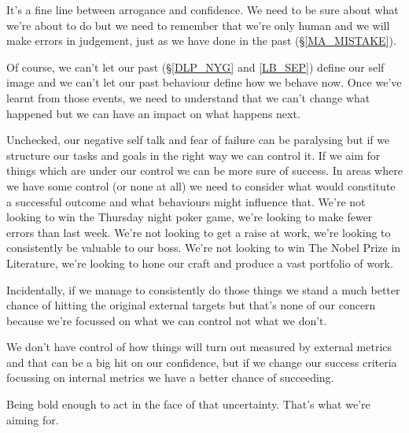 \cleardoublepage
{\small

It's a fine line between arrogance and confidence. We need to be sure about what we're about to do but we need to remember that we're only human and we will make errors in judgement, just as we have done in the past (\S \ref{MA_MISTAKE}). 

Of course, we can't let our past (\S \ref{DLP_NYG} and \ref{LB_SEP}) define our self image and we can't let our past behaviour define how we behave now. Once we've learnt from those events, we need to understand that we can't change what happened but we can have an impact on what happens next.

Unchecked, our negative self talk and fear of failure can be paralysing but if we structure our tasks and goals in the right way we can control it. If we aim for things which are under our control we can be more sure of success. In areas where we have some control (or none at all) we need to consider what would constitute a successful outcome and what behaviours might influence that. We're not looking to win the Thursday night poker game, we're looking to make fewer errors than last week. We're not looking to get a raise at work, we're looking to consistently be valuable to our boss. We're not looking to win The Nobel Prize in Literature, we're looking to hone our craft and produce a vast portfolio of work.

Incidentally, if we manage to consistently do those things we stand a much better chance of hitting the original external targets but that's none of our concern because we're focussed on what we can control not what we don't.

We don't have control of how things will turn out measured by external metrics and that can be a big hit on our confidence, but if we change our success criteria focussing on internal metrics we have a better chance of succeeding. 

Being bold enough to act in the face of that uncertainty. That's what we're aiming for.
}

